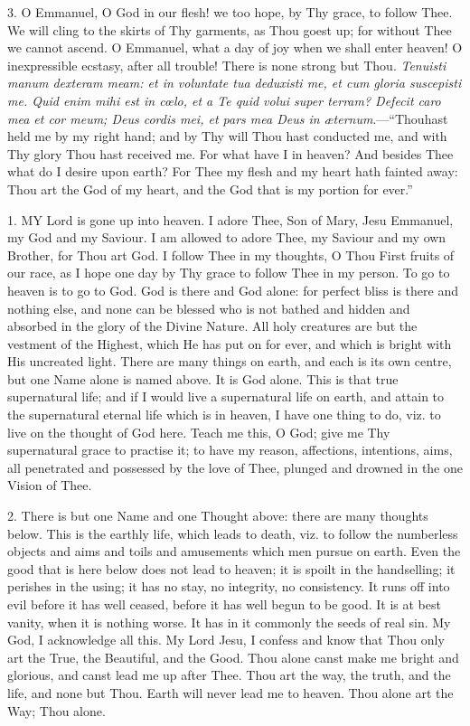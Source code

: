 3. O Emmanuel, O God in our
flesh! we too hope, by Thy grace, to follow Thee. We will cling to the
skirts of Thy garments, as Thou goest up; for without Thee we cannot
ascend. O Emmanuel, what a day of joy when we shall enter heaven! O
inexpressible ecstasy, after all trouble! There is none strong but
Thou. \emph{Tenuisti manum dexteram meam: et in voluntate tua deduxisti me,
et cum gloria suscepisti me. Quid enim mihi est in cœlo, et a Te quid
volui super terram? Defecit caro mea et cor meum; Deus cordis mei, et
pars mea Deus in æternum}.—``Thou\emph{}hast held me by my right
hand; and by Thy will Thou hast conducted me, and with Thy glory Thou
hast received me. For what have I in heaven? And besides Thee what do I
desire upon earth? For Thee my flesh and my heart hath fainted away:
Thou art the God of my heart, and the God that is my portion for ever.''


1. MY
Lord is gone up into heaven. I adore Thee, Son of Mary, Jesu Emmanuel,
my God and my Saviour. I am allowed to adore Thee, my Saviour and my own
Brother, for Thou art God. I follow Thee in my thoughts, O Thou First
fruits of our race, as I hope one day by Thy grace to follow Thee in my
person. To go to heaven is to go to God. God is there and God alone: for
perfect bliss is there and nothing else, and none can be blessed who is
not bathed and hidden and absorbed in the glory of the Divine Nature.
All holy creatures are but the vestment of the Highest, which He has put
on for ever, and which is bright with His uncreated light. There are
many things on earth, and each is its own centre, but one Name
alone is named above. It is God alone. This is that true supernatural
life; and if I would live a supernatural life on earth, and attain to
the supernatural eternal life which is in heaven, I have one thing to
do, viz. to live on the thought of God here. Teach me this, O God; give
me Thy supernatural grace to practise it; to have my reason, affections,
intentions, aims, all penetrated and possessed by the love of Thee,
plunged and drowned in the one Vision of Thee.

2. There is but one Name and one
Thought above: there are many thoughts below. This is the earthly life,
which leads to death, viz. to follow the numberless objects and aims and
toils and amusements which men pursue on earth. Even the good that is
here below does not lead to heaven; it is spoilt in the handselling; it
perishes in the using; it has no stay, no integrity, no consistency. It
runs off into evil before it has well ceased, before it has well begun
to be good. It is at best vanity, when it is nothing worse. It has in it
commonly the seeds of real sin. My God, I acknowledge all this. My Lord
Jesu, I confess and know that Thou only art the True, the Beautiful, and
the Good. Thou alone canst make me bright and glorious, and canst lead
me up after Thee. Thou art the way, the truth, and the life, and none
but Thou. Earth will never lead me to heaven. Thou alone art the Way;
Thou alone.

